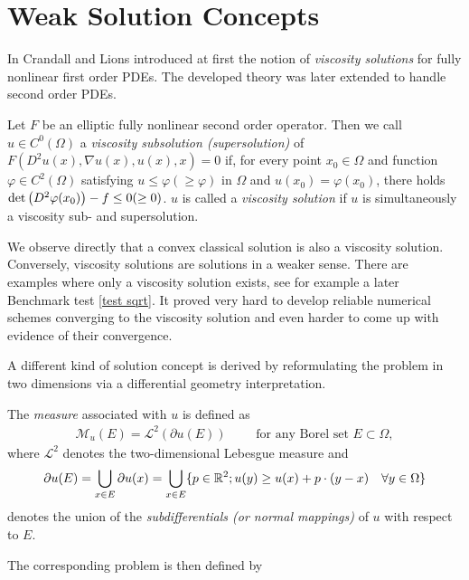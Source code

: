 \section{Weak Solution Concepts}
In \cite{CL1983} Crandall and Lions introduced at first the notion of \emph{viscosity solutions} for fully nonlinear first order PDEs. The developed theory was later extended to handle second order PDEs.
\begin{definition}
	Let $F$ be an elliptic  fully nonlinear second order operator.
	Then we call $u \in C^0(\Omega)$ a \emph{viscosity subsolution (supersolution)} of $F(D^2u(x), \nabla u(x), u(x), x)=0$  if, for every point $x_0 \in \Omega$ and function $\varphi \in C^2(\Omega)$ satisfying $u \leq \varphi (\geq \varphi)$ in $\Omega$ and $u(x_0) = \varphi(x_0)$, there holds $\det{\left(D^2 \varphi(x_0)\right)} - f \leq 0 (\geq 0)$. 
	$u$ is called a \emph{viscosity solution} if $u$ is simultaneously a viscosity sub- and supersolution.
\end{definition}

We observe directly that a convex classical solution is also a viscosity solution. Conversely, viscosity solutions are solutions in a weaker sense. There are examples where only a viscosity solution exists, see for example a later Benchmark test \ref{test sqrt}.
It proved very hard to develop reliable numerical schemes converging to the viscosity solution and even harder to come up with evidence of their convergence.

A different kind of solution concept is derived by reformulating the \MA problem in two dimensions via a differential geometry interpretation.

\begin{definition}\label{def:MA measure}
	The \emph{\MA measure} associated with $u$ is defined as 
	\begin{align}
		\mathcal{M}_u (E) = \mathcal{L}^2(\partial u(E)) \qquad \text{ for any Borel set } E \subset \Omega,
	\end{align}
	where $\mathcal{L}^2$ denotes the two-dimensional Lebesgue measure and 
	\[
		\partial u(E) = \bigcup_{x \in E} \partial u (x) = \bigcup_{x \in E} \{p \in \mathbb{R}^2; u(y) \geq u(x) +p\cdot (y-x) \quad \forall y \in \Omega\}
	\]
	denotes the union of the \emph{subdifferentials (or normal mappings)} of $u$ with respect to $E$.
\end{definition}
The corresponding \MA problem is then defined by

